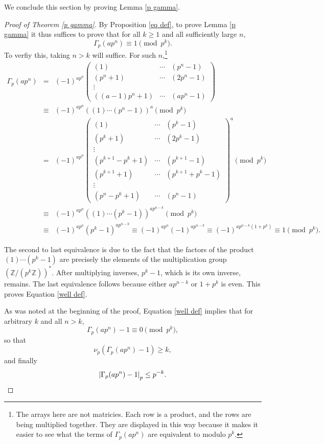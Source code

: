 \documentclass[12pt, letter]{article}    %
\theoremstyle{plain}
\theoremstyle{definition}
\numberwithin{equation}{section}
\newcommand{\thref}[1]{Theorem \ref{#1}}
\newcommand{\lemref}[1]{Lemma \ref{#1}}
\newcommand{\propref}[1]{Proposition \ref{#1}}
\newcommand{\eref}[1]{Equation \ref{#1}}
\begin{document}
We conclude this section by proving \lemref{p gamma}.

\begin{proof}[Proof of \thref{p gamma}]
By \propref{eq def}, to prove \lemref{p gamma} it thus suffices to prove that for all $k\geq 1$ and all sufficiently large $n$, 
\begin{equation}\label{well def}
\Gamma_p(ap^n)\equiv 1\pmod{p^k}.\end{equation}
To verfiy this, taking $n>k$ will suffice. For such $n$,\footnote{The arrays here are not matricies. Each row is a product, and the rows are being multiplied together. They are displayed in this way because it makes it easier to see what the terms of $\Gamma_p(ap^n)$ are equivalent to modulo $p^k$.}
\begin{eqnarray*}
 \Gamma_p(ap^n)&=&(-1)^{ap^n}
\left(\begin{array}{ccc}
(1) & \cdots & (p^n-1)\\
(p^n+1) & \cdots & (2p^n-1)\\
\vdots\\
((a-1)p^n+1) & \cdots & (ap^n-1)
\end{array}\right)
\\
&\equiv&(-1)^{ap^n}\left((1)\cdots(p^n-1)\right)^a \pmod{p^k}\\
&=&(-1)^{ap^n}
\left(
\begin{array}{ccc}
(1) & \cdots & (p^k-1)\\
(p^k+1) & \cdots & (2p^k-1)\\
\vdots\\
(p^{k+1}-p^k+1) & \cdots & (p^{k+1}-1)\\
(p^{k+1}+1) & \cdots & (p^{k+1}+p^k-1)\\
\vdots\\
(p^n-p^k+1) & \cdots & (p^n-1)
\end{array}
\right)^a\pmod{p^k}\\
&\equiv&(-1)^{ap^n}\left((1)\cdots(p^k-1)\right)^{ap^{n-k}} \pmod{p^k}\\
&\equiv&(-1)^{ap^n}(p^k-1)^{ap^{n-k}}\equiv(-1)^{ap^n}(-1)^{ap^{n-k}}\equiv(-1)^{ap^{n-k}(1+p^k)}\equiv 1\pmod{p^k}.
\end{eqnarray*}

The second to last equivalence is due to the fact that the factors of the product $(1)\cdots(p^k-1)$ are precisely the elements of the multiplication group $(\mathbb{Z}/(p^k\mathbb{Z}))^{*}$. After multiplying inverses, $p^k-1$, which is its own inverse, remains. The last equivalence follows because either $ap^{n-k}$ or $1+p^k$ is even. This proves \eref{well def}.

As was noted at the beginning of the proof, \eref{well def} implies that for arbitrary $k$ and all $n>k$, 
$$\Gamma_p(ap^n)-1\equiv0\pmod{p^k},$$ so that 
$$\nu_p(\Gamma_p(ap^n)-1)\geq k,$$ and finally 
\[\left|\Gamma_p(ap^n)-1\right|_p\leq p^{-k}.\qedhere\] \end{proof}
\end{document}
